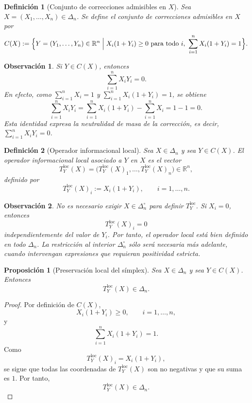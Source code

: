 \documentclass[12pt]{article}
\newtheorem{definicion}{Definición}[section]
\newtheorem{proposicion}{Proposición}[section]
\newtheorem{observacion}{Observación}[section]
\begin{document}
\begin{definicion}[Conjunto de correcciones admisibles en $X$]\label{def:CX}
Sea $X=(X_1,\dots,X_n)\in\Delta_n$. Se define el \emph{conjunto de correcciones admisibles en $X$} por
\[
C(X)
:=
\Bigl\{
Y=(Y_1,\dots,Y_n)\in\mathbb{R}^n
\;\Big|\;
X_i(1+Y_i)\ge 0\ \text{para todo } i,
\ \sum_{i=1}^n X_i(1+Y_i)=1
\Bigr\}.
\]
\end{definicion}

\begin{observacion}\label{obs:neutralidad}
Si $Y\in C(X)$, entonces
\[
\sum_{i=1}^n X_iY_i=0.
\]
En efecto, como $\sum_{i=1}^n X_i=1$ y $\sum_{i=1}^n X_i(1+Y_i)=1$, se obtiene
\[
\sum_{i=1}^n X_iY_i
=
\sum_{i=1}^n X_i(1+Y_i)-\sum_{i=1}^n X_i
=
1-1
=
0.
\]
Esta identidad expresa la neutralidad de masa de la corrección, es decir, $\sum_{i=1}^n X_iY_i=0$.
\end{observacion}

\begin{definicion}[Operador informacional local]\label{def:Tloc}
Sea $X\in\Delta_n$ y sea $Y\in C(X)$. El \emph{operador informacional local} asociado a $Y$ en $X$ es el vector
\[
T_Y^{\mathrm{loc}}(X)
=
\bigl(T_Y^{\mathrm{loc}}(X)_1,\dots,T_Y^{\mathrm{loc}}(X)_n\bigr)\in\mathbb{R}^n,
\]
definido por
\[
T_Y^{\mathrm{loc}}(X)_i:=X_i(1+Y_i),\qquad i=1,\dots,n.
\]
\end{definicion}

\begin{observacion}\label{obs:frontera}
No es necesario exigir $X\in\Delta_n^\circ$ para definir $T_Y^{\mathrm{loc}}$. Si $X_i=0$, entonces
\[
T_Y^{\mathrm{loc}}(X)_i=0
\]
independientemente del valor de $Y_i$. Por tanto, el operador local está bien definido en todo $\Delta_n$. La restricción al interior $\Delta_n^\circ$ sólo será necesaria más adelante, cuando intervengan expresiones que requieran positividad estricta.
\end{observacion}

\begin{proposicion}[Preservación local del símplex]\label{prop:preservacionLocal}
Sea $X\in\Delta_n$ y sea $Y\in C(X)$. Entonces
\[
T_Y^{\mathrm{loc}}(X)\in\Delta_n.
\]
\end{proposicion}

\begin{proof}
Por definición de $C(X)$,
\[
X_i(1+Y_i)\ge 0,\qquad i=1,\dots,n,
\]
y
\[
\sum_{i=1}^n X_i(1+Y_i)=1.
\]
Como
\[
T_Y^{\mathrm{loc}}(X)_i=X_i(1+Y_i),
\]
se sigue que todas las coordenadas de $T_Y^{\mathrm{loc}}(X)$ son no negativas y que su suma es $1$. Por tanto,
\[
T_Y^{\mathrm{loc}}(X)\in\Delta_n.
\]
\end{proof}
\end{document}
